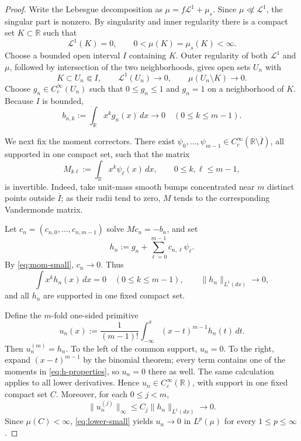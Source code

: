 \documentclass[11pt]{article}
\newcommand{\R}{\mathbb R}
\newcommand{\Leb}{\mathcal L^1}
\begin{document}
\begin{proof}
Write the Lebesgue decomposition as $\mu=f\Leb+\mu_s$.  Since
$\mu\not\ll\Leb$, the singular part is nonzero.  By singularity and inner
regularity there is a compact set $K\subset\R$ such that
\[
  \Leb(K)=0,
  \qquad 0<\mu(K)=\mu_s(K)<\infty.
\]
Choose a bounded open interval $I$ containing $K$.  Outer regularity of both
$\Leb$ and $\mu$, followed by intersection of the two neighborhoods, gives
open sets $U_n$ with
\[
  K\subset U_n\Subset I,
  \qquad \Leb(U_n)\longrightarrow0,
  \qquad \mu(U_n\setminus K)\longrightarrow0.
\]
Choose $g_n\in C_c^\infty(U_n)$ such that $0\le g_n\le1$ and $g_n=1$ on a
neighborhood of $K$.  Because $I$ is bounded,
\begin{equation}\label{eq:mom-small}
 b_{n,k}:=\int_{\R}x^k g_n(x)\,dx\longrightarrow0
 \quad (0\le k\le m-1).
\end{equation}

We next fix the moment correctors.  There exist
$\psi_0,\ldots,\psi_{m-1}\in C_c^\infty(\R\setminus\overline I)$, all
supported in one compact set, such that the matrix
\[
 M_{k\ell}:=\int_{\R}x^k\psi_\ell(x)\,dx,
 \qquad 0\le k,\ell\le m-1,
\]
is invertible.  Indeed, take unit-mass smooth bumps concentrated near $m$
distinct points outside $\overline I$; as their radii tend to zero, $M$ tends
to the corresponding Vandermonde matrix.

Let $c_n=(c_{n,0},\ldots,c_{n,m-1})$ solve $Mc_n=-b_n$, and set
\[
 h_n:=g_n+\sum_{\ell=0}^{m-1}c_{n,\ell}\psi_\ell.
\]
By \eqref{eq:mom-small}, $c_n\to0$.  Thus
\begin{equation}\label{eq:h-properties}
 \int x^k h_n(x)\,dx=0\quad(0\le k\le m-1),
 \qquad \|h_n\|_{L^1(dx)}\longrightarrow0,
\end{equation}
and all $h_n$ are supported in one fixed compact set.

Define the $m$-fold one-sided primitive
\[
 u_n(x):=\frac1{(m-1)!}\int_{-\infty}^{x}(x-t)^{m-1}h_n(t)\,dt.
\]
Then $u_n^{(m)}=h_n$.  To the left of the common support, $u_n=0$.  To
the right, expand $(x-t)^{m-1}$ by the binomial theorem; every term contains
one of the moments in \eqref{eq:h-properties}, so $u_n=0$ there as well.
The same calculation applies to all lower derivatives.  Hence
$u_n\in C_c^\infty(\R)$, with support in one fixed compact set $C$.
Moreover, for each $0\le j<m$,
\begin{equation}\label{eq:lower-small}
 \|u_n^{(j)}\|_\infty\le C_j\|h_n\|_{L^1(dx)}\longrightarrow0.
\end{equation}
Since $\mu(C)<\infty$, \eqref{eq:lower-small} yields $u_n\to0$ in
$L^p(\mu)$ for every $1\le p\le\infty$.


\end{proof}
\end{document}
